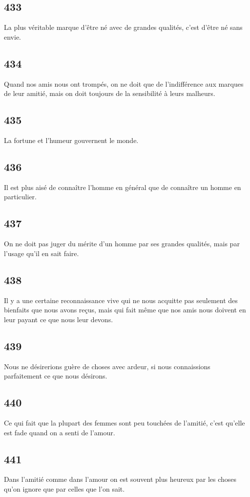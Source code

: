 \documentclass[french,twoside]{book} %
\begin{document}
\subsection[{433}]{ \textsc{433} }
\noindent La plus véritable marque d’être né avec de grandes qualités, c’est d’être né sans envie.
\subsection[{434}]{ \textsc{434} }
\noindent Quand nos amis nous ont trompés, on ne doit que de l’indifférence aux marques de leur amitié, mais on doit toujours de la sensibilité à leurs malheurs.
\subsection[{435}]{ \textsc{435} }
\noindent La fortune et l’humeur gouvernent le monde.
\subsection[{436}]{ \textsc{436} }
\noindent Il est plus aisé de connaître l’homme en général que de connaître un homme en particulier.
\subsection[{437}]{ \textsc{437} }
\noindent On ne doit pas juger du mérite d’un homme par ses grandes qualités, mais par l’usage qu’il en sait faire.
\subsection[{438}]{ \textsc{438} }
\noindent Il y a une certaine reconnaissance vive qui ne nous acquitte pas seulement des bienfaits que nous avons reçus, mais qui fait même que nos amis nous doivent en leur payant ce que nous leur devons.
\subsection[{439}]{ \textsc{439} }
\noindent Nous ne désirerions guère de choses avec ardeur, si nous connaissions parfaitement ce que nous désirons.
\subsection[{440}]{ \textsc{440} }
\noindent Ce qui fait que la plupart des femmes sont peu touchées de l’amitié, c’est qu’elle est fade quand on a senti de l’amour.
\subsection[{441}]{ \textsc{441} }
\noindent Dans l’amitié comme dans l’amour on est souvent plus heureux par les choses qu’on ignore que par celles que l’on sait.
\end{document}

